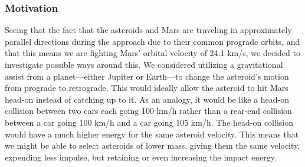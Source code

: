 \documentclass[a4paper]{article}
\begin{document}
	\subsubsection{Motivation}
	Seeing that the fact that the asteroids and Mars are traveling in approximately parallel directions during the approach due to their common prograde orbits, and that this means we are fighting Mars' orbital velocity of 24.1 km/s, we decided to investigate possible ways around this. We considered utilizing a gravitational assist from a planet---either Jupiter or Earth---to change the asteroid's motion from prograde to retrograde. This would ideally allow the asteroid to hit Mars head-on instead of catching up to it.
    As an analogy, it would be like a head-on collision between two cars each going 100 km/h rather than a rear-end collision between a car going 100 km/h and a car going 105 km/h. The head-on collision would have a much higher energy for the same asteroid velocity. This means that we might be able to select asteroids of lower mass, giving them the same velocity, expending less impulse, but retaining or even increasing the impact energy.
\end{document}
